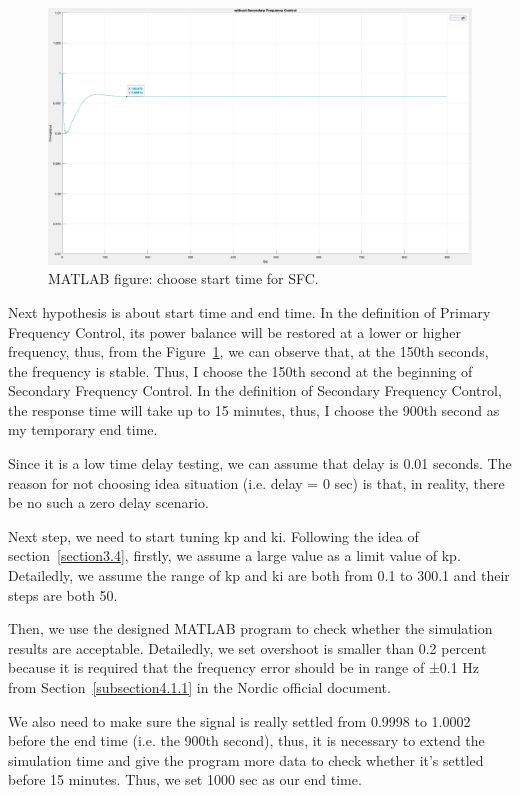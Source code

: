 \begin{figure}[htbp]
\centering
\includegraphics[width = .891\textwidth]{figure/4_1_1_without3.jpeg}
\caption{MATLAB figure: choose start time for SFC.}
\label{4_1_1_without3}
\end{figure}
Next hypothesis is about start time and end time. In the definition of Primary Frequency Control, its power balance will be restored at a lower or higher frequency, thus, from the Figure~\ref{4_1_1_without3}, we can observe that, at the 150th seconds, the frequency is stable. Thus, I choose the 150th second at the beginning of Secondary Frequency Control. In the definition of Secondary Frequency Control, the response time will take up to 15 minutes, thus, I choose the 900th second as my temporary end time. 

Since it is a low time delay testing, we can assume that delay is 0.01 seconds. The reason for not choosing idea situation (i.e. delay = 0 sec) is that, in reality, there be no such a zero delay scenario. 

Next step, we need to start tuning kp and ki. Following the idea of section~\ref{section3.4}, firstly, we assume a large value as a limit value of kp. Detailedly, we assume the range of kp and ki are both from 0.1 to 300.1 and their steps are both 50.  

Then, we use the designed MATLAB program to check whether the simulation results are acceptable. Detailedly, we set overshoot is smaller than 0.2 percent because it is required that the frequency error should be in range of ±0.1 Hz from Section~\ref{subsection4.1.1} in the Nordic official document. 

We also need to make sure the signal is really settled from 0.9998 to 1.0002 before the end time (i.e. the 900th second), thus, it is necessary to extend the simulation time and give the program more data to check whether it's settled before 15 minutes. Thus, we set 1000 sec as our end time.

